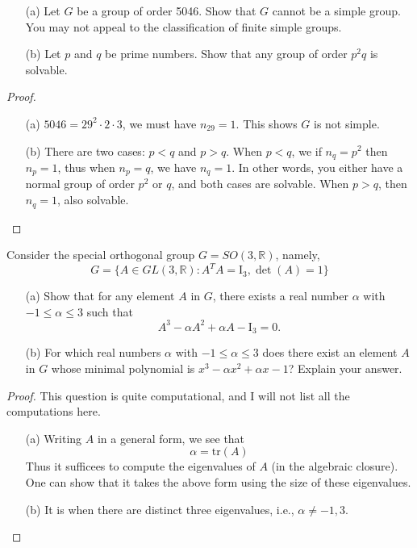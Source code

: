 \documentclass[openany]{book}
\begin{document}
\begin{prob}
    \begin{itemize}
        \item[(a)] Let \(G\) be a group of order 5046. Show that \(G\) cannot be a simple group. You may not appeal to the classification of finite simple groups.
        \item[(b)] Let \(p\) and \(q\) be prime numbers. Show that any group of order \(p^2q\) is solvable.
    \end{itemize}
\end{prob}
\begin{proof}
    \begin{itemize}
        \item[(a)] $5046=29^2\cdot 2\cdot 3$, we must have $n_{29}=1$. This shows $G$ is not simple.
        \item[(b)] There are two cases: $p<q$ and $p>q$. When $p<q$, we if $n_{q}=p^2$ then $n_p=1$, thus when $n_p=q$, we have $n_q=1$. In other words, you either have a normal group of order $p^2$ or $q$, and both cases are solvable. When $p>q$, then $n_q=1$, also solvable.
    \end{itemize}
\end{proof}



\begin{prob}
    Consider the special orthogonal group \(G=SO(3,\mathbb{R})\), namely,
    \[G=\{A\in GL(3,\mathbb{R}): A^T A=\mathrm{I}_3, \det(A)=1\}\]
    \begin{itemize}
        \item[(a)] Show that for any element \(A\) in \(G\), there exists a real number \(\alpha\) with \(-1\leq\alpha\leq 3\) such that
        \[A^3-\alpha A^2+\alpha A-\mathrm{I}_3=0.\]
        \item[(b)] For which real numbers \(\alpha\) with \(-1\leq\alpha\leq 3\) does there exist an element \(A\) in \(G\) whose minimal polynomial is \(x^3-\alpha x^2+\alpha x-1\)? Explain your answer.
    \end{itemize}
\end{prob}
\begin{proof}
    This question is quite computational, and I will not list all the computations here.
    \begin{itemize}
        \item[(a)] Writing $A$ in a general form, we see that 
        \begin{equation*}
            \alpha=\text{tr}(A)
        \end{equation*}
        Thus it sufficees to compute the eigenvalues of $A$ (in the algebraic closure). One can show that it takes the above form using the size of these eigenvalues.
        \item[(b)] It is when there are distinct three eigenvalues, i.e., $\alpha\neq -1, 3$.
    \end{itemize}

\end{proof}
\end{document}
